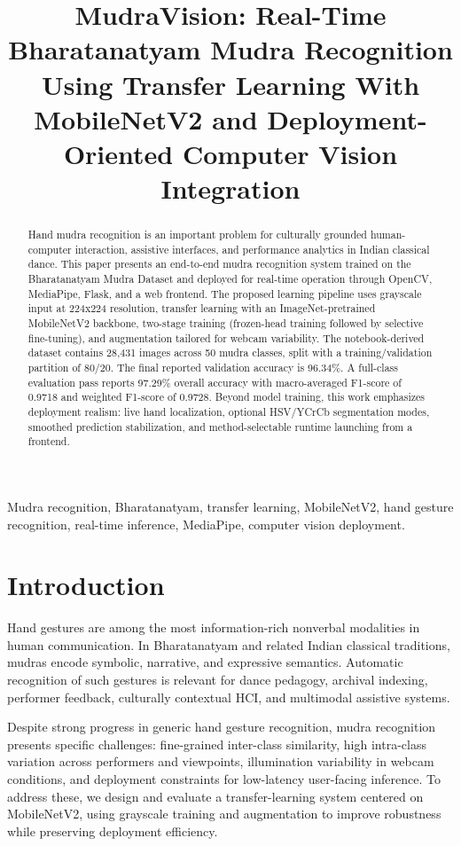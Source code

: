 \documentclass[conference]{IEEEtran}
\title{MudraVision: Real-Time Bharatanatyam Mudra Recognition Using Transfer Learning With MobileNetV2 and Deployment-Oriented Computer Vision Integration}
\author{\IEEEauthorblockN{Rishitha et al.}
\IEEEauthorblockA{Mudra Recognition Project\\
India\\
Email: contact@example.com}}
\begin{document}
\maketitle

\begin{abstract}
Hand mudra recognition is an important problem for culturally grounded human-computer interaction, assistive interfaces, and performance analytics in Indian classical dance. This paper presents an end-to-end mudra recognition system trained on the Bharatanatyam Mudra Dataset and deployed for real-time operation through OpenCV, MediaPipe, Flask, and a web frontend. The proposed learning pipeline uses grayscale input at 224x224 resolution, transfer learning with an ImageNet-pretrained MobileNetV2 backbone, two-stage training (frozen-head training followed by selective fine-tuning), and augmentation tailored for webcam variability. The notebook-derived dataset contains 28,431 images across 50 mudra classes, split with a training/validation partition of 80/20. The final reported validation accuracy is 96.34\%. A full-class evaluation pass reports 97.29\% overall accuracy with macro-averaged F1-score of 0.9718 and weighted F1-score of 0.9728. Beyond model training, this work emphasizes deployment realism: live hand localization, optional HSV/YCrCb segmentation modes, smoothed prediction stabilization, and method-selectable runtime launching from a frontend.
\end{abstract}

\begin{IEEEkeywords}
Mudra recognition, Bharatanatyam, transfer learning, MobileNetV2, hand gesture recognition, real-time inference, MediaPipe, computer vision deployment.
\end{IEEEkeywords}

\section{Introduction}
Hand gestures are among the most information-rich nonverbal modalities in human communication. In Bharatanatyam and related Indian classical traditions, mudras encode symbolic, narrative, and expressive semantics. Automatic recognition of such gestures is relevant for dance pedagogy, archival indexing, performer feedback, culturally contextual HCI, and multimodal assistive systems.

Despite strong progress in generic hand gesture recognition, mudra recognition presents specific challenges: fine-grained inter-class similarity, high intra-class variation across performers and viewpoints, illumination variability in webcam conditions, and deployment constraints for low-latency user-facing inference. To address these, we design and evaluate a transfer-learning system centered on MobileNetV2, using grayscale training and augmentation to improve robustness while preserving deployment efficiency.
\end{document}
